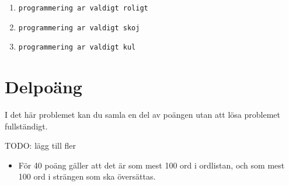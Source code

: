 \begin{enumerate}
    \item \texttt{programmering ar valdigt roligt}
    \item \texttt{programmering ar valdigt skoj}
    \item \texttt{programmering ar valdigt kul}
\end{enumerate}

\section*{Delpoäng}
I det här problemet kan du samla en del av poängen utan att lösa problemet fullständigt.

TODO: lägg till fler
\begin{itemize}
    \item För 40 poäng gäller att det är som mest 100 ord i ordlistan, och som mest 100 ord i strängen som ska översättas.
\end{itemize}
